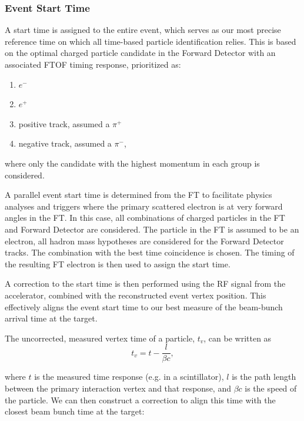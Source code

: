 \subsubsection{Event Start Time}

A start time is assigned to the entire event, which serves as our most precise reference time on which all
time-based particle identification relies.  This is based on the optimal charged particle candidate in the
Forward Detector with an associated FTOF timing response, prioritized as:

\begin{enumerate}
    \item $e^-$
    \item $e^+$
    \item positive track, assumed a $\pi^+$
    \item negative track, assumed a $\pi^-$,
\end{enumerate}

\noindent
where only the candidate with the highest momentum in each group is considered.

A parallel event start time is determined from the FT to facilitate physics analyses and triggers where the
primary scattered electron is at very forward angles in the FT. In this case, all combinations of charged
particles in the FT and Forward Detector are considered. The particle in the FT is assumed to be an electron,
all hadron mass hypotheses are considered for the Forward Detector tracks. The combination with the best
time coincidence is chosen. The timing of the resulting FT electron is then used to assign the start time.

A correction to the start time is then performed using the RF signal from the accelerator, combined with the
reconstructed event vertex position. This effectively aligns the event start time to our best measure of the
beam-bunch arrival time at the target.

The uncorrected, measured vertex time of a particle, $t_v$, can be written as
\begin{equation}
    t_v = t-\frac{l}{\beta c},
\end{equation}

\noindent
where $t$ is the measured time response (e.g. in a scintillator), $l$ is the path length between the primary
interaction vertex and that response, and $\beta c$ is the speed of the particle.  We can then construct a
correction to align this time with the closest beam bunch time at the target:

